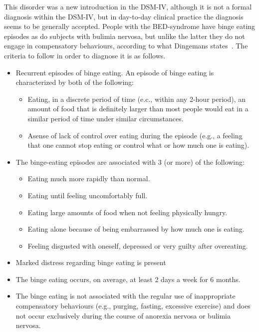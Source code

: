 This disorder was a new introduction in the DSM-IV, although it is not a formal diagnosis within the DSM-IV, but in day-to-day clinical practice the diagnosis seems to be generally accepted. People with the BED-syndrome have binge eating episodes as do subjects with bulimia nervosa, but unlike the latter they do not engage in compensatory behaviours, according to what Dingemans states~\cite{dingemans2002binge}. The criteria to follow in order to diagnose it is as follows.
\begin{itemize}
    \item Recurrent episodes of binge eating. An episode of binge eating is characterized by both of the following:
    \begin{itemize}
        \item Eating, in a discrete period of time (e.c., within any 2-hour period), an amount of food that is definitely larger than most people would eat in a similar period of time under similar circumstances.
        \item Asense of lack of control over eating during the episode (e.g., a feeling that one cannot stop eating or control what or how much one is eating).
    \end{itemize}
    \item The binge-eating episodes are associated with 3 (or more) of the following:
    \begin{itemize}
        \item Eating much more rapidly than normal.
        \item Eating until feeling uncomfortably full.
        \item Eating large amounts of food when not feeling physically hungry.
        \item Eating alone because of being embarrassed by how much one is eating.
        \item Feeling disgusted with oneself, depressed or very guilty after overeating.
    \end{itemize}
    \item Marked distress regarding binge eating is present
    \item The binge eating occurs, on average, at least 2 days a week for 6 months.
    \item The binge eating is not associated with the regular use of inappropriate compensatory behaviours (e.g., purging, fasting, excessive exercise) and does not occur exclusively during the course of anorexia nervosa or bulimia nervosa.

\end{itemize}


